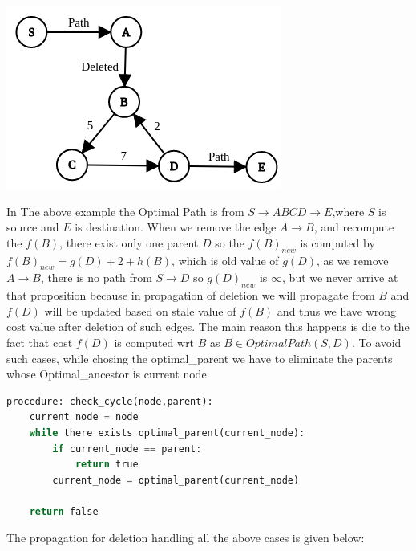 \documentclass[a4paper]{article}
\begin{document}
\begin{center}
\includegraphics[scale=0.45]{img/cycle.png}        
\end{center}
In The above example the Optimal Path is from $S \rightarrow ABCD \rightarrow E$,where $S$ is source and $E$ is destination. When we remove the edge $A \rightarrow B$, and recompute the $f(B)$, there exist only one parent $D$ so the $f(B)_{new}$ is computed by $f(B)_{new} = g(D) + 2 + h(B)$, which is old value of $g(D)$, as we remove $A \rightarrow B$, there is no path from $S \rightarrow D$ so $g(D)_{new}$ is $\infty$, but we never arrive at that proposition because in propagation of deletion we will propagate from $B$  and $f(D)$ will be updated based on stale value of $f(B)$ and thus we have wrong cost value after deletion of such edges. The main reason this happens is die to the fact that cost $f(D)$ is computed wrt $B$ as $B \in OptimalPath(S,D)$. To avoid such cases, while chosing the optimal\_parent we have to eliminate the parents whose Optimal\_ancestor is current node.\\
\begin{lstlisting}[language=python, caption=Check Cycles]
procedure: check_cycle(node,parent):
    current_node = node
    while there exists optimal_parent(current_node):
        if current_node == parent:
            return true
        current_node = optimal_parent(current_node)
    
    return false
\end{lstlisting}

The propagation for deletion handling all the above cases is given below: 
\end{document}
